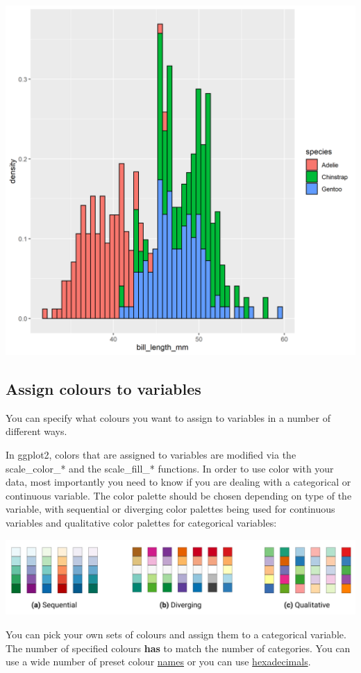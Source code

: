 \documentclass[
]{book}
\begin{document}
\includegraphics[width=0.8\linewidth]{images/color_fill}

\hypertarget{assign-colours-to-variables}{%
\subsection{Assign colours to variables}\label{assign-colours-to-variables}}

You can specify what colours you want to assign to variables in a number of different ways.

In ggplot2, colors that are assigned to variables are modified via the scale\_color\_* and the scale\_fill\_* functions. In order to use color with your data, most importantly you need to know if you are dealing with a categorical or continuous variable. The color palette should be chosen depending on type of the variable, with sequential or diverging color palettes being used for continuous variables and qualitative color palettes for categorical variables:

\includegraphics[width=0.8\linewidth]{images/palette}

You can pick your own sets of colours and assign them to a categorical variable. The number of specified colours \textbf{has} to match the number of categories. You can use a wide number of preset colour \href{https://www.datanovia.com/en/blog/awesome-list-of-657-r-color-names/}{names} or you can use \href{https://www.datanovia.com/en/blog/awesome-list-of-hexadecimal-colors-you-should-have/}{hexadecimals}.
\end{document}

